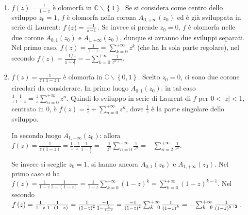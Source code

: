 \documentclass{article}
\begin{document}
\begin{enumerate}
\item $f\left( z\right) =\frac{1}{1-z}$ \`{e} olomorfa in $%
\mathbb{C}
\backslash \left\{ 1\right\} $. Se si considera come centro dello sviluppo $%
z_{0}=1$, $f$ \`{e} olomorfa nella corona $A_{0,+\infty }\left( z_{0}\right) 
$ ed \`{e} gi\`{a} sviluppata in serie di Laurent: $f\left( z\right) =\frac{%
-1}{z-1}$. Se invece si prende $z_{0}=0$, $f$ \`{e} olomorfa nelle due
corone $A_{0,1}\left( z_{0}\right) $ e $A_{1,+\infty }\left( z_{0}\right) $,
dunque si avranno due sviluppi separati. Nel primo caso, $f\left( z\right) =%
\frac{1}{1-z}=\sum_{k=0}^{+\infty }z^{k}$ (che ha la sola parte regolare),
nel secondo $f\left( z\right) =\frac{-1/z}{1-\frac{1}{z}}=-\sum_{k=0}^{+%
\infty }\frac{1}{z^{k+1}}$.

\item $f\left( z\right) =\frac{1}{z\left( 1-z\right) }$ \`{e} olomorfa in $%
\mathbb{C}
\backslash \left\{ 0,1\right\} $. Scelto $z_{0}=0$, ci sono due corone
circolari da considerare. In primo luogo $A_{0,1}\left( z_{0}\right) $: in
tal caso $\frac{1}{z}\frac{1}{1-z}=\frac{1}{z}\sum_{n=0}^{+\infty }z^{n}$.
Quindi lo sviluppo in serie di Laurent di $f$ per $0<\left\vert z\right\vert
<1$, centrato in $0$, \`{e} $f\left( z\right) =\frac{1}{z}%
+\sum_{n=0}^{+\infty }z^{n}$, dove $\frac{1}{z}$ \`{e} la parte singolare
dello sviluppo.

In secondo luogo $A_{1,+\infty }\left( z_{0}\right) $: allora $f\left(
z\right) =\frac{1}{z\left( 1-z\right) }=\frac{1}{z}\frac{-1}{z}\frac{1}{1-%
\frac{1}{z}}=-\frac{1}{z^{2}}\sum_{n=0}^{+\infty }\frac{1}{z^{n}}%
=-\sum_{n=2}^{+\infty }\frac{1}{z^{n}}$.

Se invece si sceglie $z_{0}=1$, si hanno ancora $A_{0,1}\left( z_{0}\right) $
e $A_{1,+\infty }\left( z_{0}\right) $. Nel primo caso si ha $f\left(
z\right) =\frac{1}{1-z}\frac{1}{1-\left( 1-z\right) }=\frac{1}{1-z}%
\sum_{k=0}^{+\infty }\left( 1-z\right) ^{k}=\sum_{k=0}^{+\infty }\left(
1-z\right) ^{k-1}$. Nel secondo $f\left( z\right) =\frac{1}{1-z}\frac{1}{%
1-\left( 1-z\right) }=\frac{1}{\left( 1-z\right) ^{2}}\frac{-1}{1-\frac{1}{%
1-z}}=\frac{-1}{\left( 1-z\right) ^{2}}\sum_{k=0}^{+\infty }\frac{1}{\left(
1-z\right) ^{k}}=-\sum_{k=0}^{+\infty }\frac{1}{\left( 1-z\right) ^{k+2}}$.


\end{enumerate}
\end{document}
